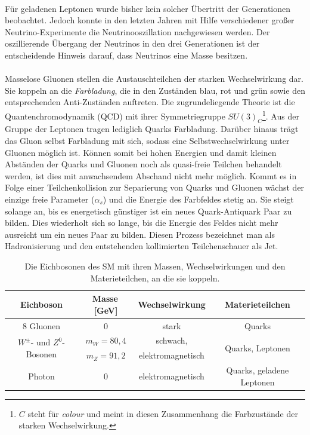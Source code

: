 \\
F\"ur geladenen Leptonen wurde bisher kein solcher \"Ubertritt der Generationen beobachtet. Jedoch konnte in den letzten Jahren mit Hilfe verschiedener gro\ss{}er Neutrino-Experimente die Neutrinooszillation 
nachgewiesen werden. Der oszillierende \"Ubergang der Neutrinos in den drei Generationen ist der entscheidende Hinweis darauf, dass Neutrinos eine Masse besitzen.\\
\\
Masselose Gluonen stellen die Austauschteilchen der starken Wechselwirkung dar. Sie koppeln an die \textit{Farbladung}, die in den Zust\"anden blau, rot und gr\"un sowie den entsprechenden Anti-Zust\"anden auftreten.
Die zugrundeliegende Theorie ist die Quantenchromodynamik (QCD) mit ihrer Symmetriegruppe $SU(3)_{C}$\footnote{$C$ steht f\"ur \textit{colour} und meint in diesen Zusammenhang die Farbzust\"ande der 
starken Wechselwirkung.}. Aus der Gruppe der Leptonen tragen lediglich Quarks Farbladung. Dar\"uber hinaus tr\"agt das Gluon selbst Farbladung mit sich, sodass eine Selbstwechselwirkung unter Gluonen
m\"oglich ist. Können somit bei hohen Energien und damit kleinen Abst\"anden der Quarks und Gluonen noch als quasi-freie Teilchen behandelt werden, ist dies mit anwachsendem Abschand nicht mehr möglich.
Kommt es in Folge einer Teilchenkollision zur Separierung von Quarks und Gluonen wächst der einzige freie Parameter ($\alpha_{s}$) und die Energie des Farbfeldes stetig an. 
Sie steigt solange an, bis es energetisch g\"unstiger ist ein neues Quark-Antiquark Paar zu bilden. Dies wiederholt sich so lange, bis die Energie des Feldes nicht mehr ausreicht um ein neues Paar zu bilden.
Diesen Prozess bezeichnet man als Hadronisierung und den entstehenden kollimierten Teilchenschauer als Jet. 
\\
\begin{table}[tp]
\centering
\begin{tabular}{c||c|c|c}
Eichboson & Masse\,[GeV] & Wechselwirkung & Materieteilchen \\ \hline\hline
8 Gluonen & 0 & stark & Quarks \\ \hline
\multirow{2}{*}{$W^{\pm}$- und $Z^{0}$-Bosonen} & $m_{W}=80,4$ & schwach, & \multirow{2}{*}{Quarks, Leptonen} \\
 & $m_{Z}=91,2$ & elektromagnetisch & \\ \hline
Photon & 0 & elektromagnetisch & Quarks, geladene Leptonen\\ \hline
\end{tabular}
	  	\caption{Die Eichbosonen des SM mit ihren Massen, Wechselwirkungen und den Materie\-teilchen, an die sie koppeln.}
	  		\label{Eichbosonen}
\end{table}


